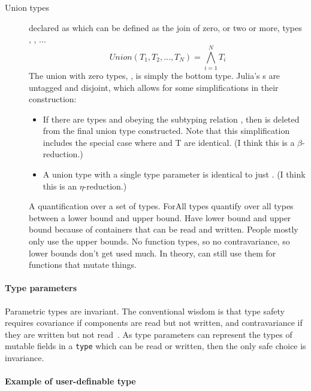 \documentclass[pldi]{sigplanconf-pldi15}
\begin{document}
\begin{description}
\item[Union types] declared as  which can be defined as
	the join of zero, or two or more, types , ,
	...~\cite[Sec.  15.7]{Pierce2002}
	\begin{equation}
		Union(T_1, T_2, ..., T_N) = \bigwedge_{i=1}^N T_i 
	\end{equation}
	The union with zero types, , is simply the bottom type.
	Julia's s are untagged and disjoint, which allows for some
	simplifications in their construction:
	\begin{itemize}
		\item If there are types  and  obeying the
			subtyping relation , then  is
			deleted from the final union type constructed. Note
			that this simplification includes the special case
			where  and \code T are identical.  (I think
			this is a $\beta$-reduction.)

		\item A union type  with a single type parameter
			 is identical to just . (I think this
			is an $\eta$-reduction.)
	\end{itemize}

\item[] A quantification over a set of types.  ForAll types
	quantify over all types between a lower bound and upper bound. Have
	lower bound and upper bound because of containers that can be read and
	written. People mostly only use the upper bounds. No function types, so
	no contravariance, so lower bounds don't get used much. In theory, can
	still use them for functions that mutate things.

\end{description}

\paragraph{Type parameters}

Parametric types are invariant.
The conventional wisdom is that type safety requires covariance if components
are read but not written, and contravariance if they are written but not
read~\cite{Castagna1995}. As type parameters can represent the types of mutable
fields in a \verb|type| which can be read or written, then the only safe choice
is invariance.

\paragraph{Example of user-definable type}
\end{document}
